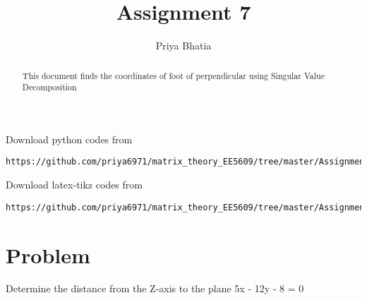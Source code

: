 \documentclass[journal,12pt,twocolumn]{IEEEtran}
\begin{document}
     \def\rightbox#1{\makebox[0in][r]{#1}}
     \def\centbox#1{\makebox[0in]{#1}}
     \def\topbox#1{\raisebox{-\baselineskip}[0in][0in]{#1}}
     \def\midbox#1{\raisebox{-0.5\baselineskip}[0in][0in]{#1}}
\vspace{3cm}
\title{Assignment 7}
\author{Priya Bhatia}
\maketitle
\newpage
\bigskip
\renewcommand{\thefigure}{\theenumi}
\renewcommand{\thetable}{\theenumi}
\begin{abstract}
This document finds the coordinates of foot of perpendicular using Singular Value Decomposition
\end{abstract}
%
Download python codes from 
%
\begin{lstlisting}
https://github.com/priya6971/matrix_theory_EE5609/tree/master/Assignment7/codes
\end{lstlisting}
%
%
Download latex-tikz codes from 
%
\begin{lstlisting}
https://github.com/priya6971/matrix_theory_EE5609/tree/master/Assignment7
\end{lstlisting}
%
\section{\textbf{Problem}}
Determine the distance from the Z-axis to the plane 5x - 12y - 8 = 0
\end{document}
